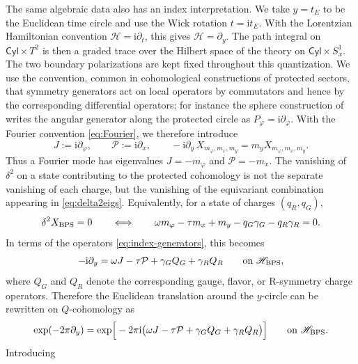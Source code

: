 \documentclass[11pt,a4paper]{article}
\numberwithin{equation}{section}
\theoremstyle{plain}
\theoremstyle{definition}
\theoremstyle{remark}
\newcommand{\ii}{\mathrm{i}}
\newcommand{\cyl}{\mathsf{Cyl}}
\begin{document}
The same algebraic data also has an index interpretation.  We take \(y=t_E\) to be the Euclidean time circle and use the Wick rotation \(t=\ii t_E\).  With the Lorentzian Hamiltonian convention \(\mathcal H=\ii\partial_t\), this gives \(\mathcal H=\partial_y\).  The path integral on \(\cyl\times T^2\) is then a graded trace over the Hilbert space of the theory on \(\cyl\times S^1_x\).  The two boundary polarizations are kept fixed throughout this quantization.  We use the convention, common in cohomological constructions of protected sectors, that symmetry generators act on local operators by commutators and hence by the corresponding differential operators; for instance the sphere construction of \cite{Dedushenko:2016jxl} writes the angular generator along the protected circle as \(P_\varphi=\ii\partial_\varphi\).  With the Fourier convention \eqref{eq:Fourier}, we therefore introduce
\begin{equation}
J:=\ii\partial_\varphi,
\qquad
\mathcal P:=\ii\partial_x,
\qquad
-\ii\partial_y\,X_{m_\varphi,m_x,m_y}=m_y X_{m_\varphi,m_x,m_y}.
\label{eq:index-generators}
\end{equation}
Thus a Fourier mode has eigenvalues \(J=-m_\varphi\) and \(\mathcal P=-m_x\).  The vanishing of \(\delta^2\) on a state contributing to the protected cohomology is not the separate vanishing of each charge, but the vanishing of the equivariant combination appearing in \eqref{eq:delta2eigs}.  Equivalently, for a state of charges \((q_R,q_G)\),
\begin{equation}
\delta^2 X_{\rm BPS}=0
\qquad\Longleftrightarrow\qquad
\omega m_\varphi-\tau m_x+m_y-q_G\gamma_G-q_R\gamma_R=0.
\label{eq:index-BPS-constraint-modes}
\end{equation}
In terms of the operators \eqref{eq:index-generators}, this becomes
\begin{equation}
-\ii\partial_y
=
\omega J-\tau\mathcal P+\gamma_G Q_G+\gamma_R Q_R
\qquad\hbox{on }\mathscr H_{\rm BPS},
\label{eq:index-BPS-operator-relation}
\end{equation}
where \(Q_G\) and \(Q_R\) denote the corresponding gauge, flavor, or R-symmetry charge operators.  Therefore the Euclidean translation around the \(y\)-circle can be rewritten on \(Q\)-cohomology as
\begin{equation}
\exp(-2\pi\partial_y)
=
\exp\!\Big[-2\pi\ii\big(\omega J-\tau\mathcal P+\gamma_G Q_G+\gamma_R Q_R\big)\Big]
\qquad\hbox{on }\mathscr H_{\rm BPS}.
\label{eq:index-evolution-rewritten}
\end{equation}
Introducing
\end{document}
